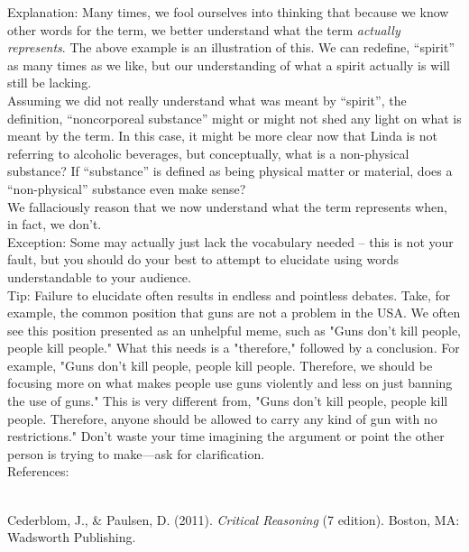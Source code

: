 \documentclass[a4paper,12pt,single,pdftex]{scrartcl}
\begin{document}
{    
      Explanation: Many times, we fool ourselves into thinking that because we know other words for the term, we better understand what the term {\it actually represents}.  The above example is an illustration of this.  We can redefine, “spirit” as many times as we like, but our understanding of what a spirit actually is will still be lacking.
    \\

    
      Assuming we did not really understand what was meant by “spirit”, the definition, “noncorporeal substance” might or might not shed any light on what is meant by the term.  In this case, it might be more clear now that Linda is not referring to alcoholic beverages, but conceptually, what is a non-physical substance?  If “substance” is defined as being physical matter or material, does a “non-physical” substance even make sense?
    \\

    
      We fallaciously reason that we now understand what the term represents when, in fact, we don’t.
    \\

    
      Exception: Some may actually just lack the vocabulary needed -- this is not your fault, but you should do your best to attempt to elucidate using words understandable to your audience.
    \\

    
      Tip: Failure to elucidate often results in endless and pointless debates. Take, for example, the common position that guns are not a problem in the USA. We often see this position presented as an unhelpful meme, such as "Guns don't kill people, people kill people." What this needs is a "therefore," followed by a conclusion. For example, "Guns don't kill people, people kill people. Therefore, we should be focusing more on what makes people use guns violently and less on just banning the use of guns." This is very different from, "Guns don't kill people, people kill people. Therefore, anyone should be allowed to carry any kind of gun with no restrictions." Don't waste your time imagining the argument or point the other person is trying to make—ask for clarification.
    \\

    References:

    
      
        
      \\

      
        
          Cederblom, J., \& Paulsen, D. (2011). {\it Critical Reasoning} (7 edition). Boston, MA: Wadsworth Publishing.
        
      
    
  }
\end{document}

